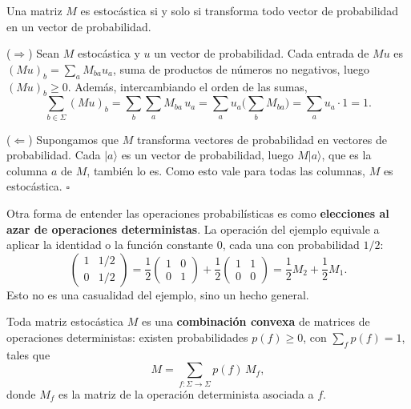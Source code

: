 \documentclass[11pt, a4paper, twoside, openright]{report}
\begin{document}
\begin{tcolorbox}[colback=teal!5!white,colframe=teal!75!black,title=\textbf{Proposición: Caracterización de las matrices estocásticas}]
Una matriz $M$ es estocástica si y solo si transforma todo vector de probabilidad en un vector de probabilidad.
\end{tcolorbox}

\begin{tcolorbox}[colback=gray!5!white,colframe=gray!75!black,title=\textbf{Demostración}]
($\Rightarrow$) Sean $M$ estocástica y $u$ un vector de probabilidad. Cada entrada de $Mu$ es $(Mu)_b = \sum_{a} M_{ba} u_a$, suma de productos de números no negativos, luego $(Mu)_b \geq 0$. Además, intercambiando el orden de las sumas,
\[ \sum_{b \in \Sigma} (Mu)_b = \sum_{b}\sum_{a} M_{ba}\, u_a = \sum_{a} u_a \Big( \sum_{b} M_{ba} \Big) = \sum_{a} u_a \cdot 1 = 1. \]

($\Leftarrow$) Supongamos que $M$ transforma vectores de probabilidad en vectores de probabilidad. Cada $|a\rangle$ es un vector de probabilidad, luego $M|a\rangle$, que es la columna $a$ de $M$, también lo es. Como esto vale para todas las columnas, $M$ es estocástica. \hfill $\square$
\end{tcolorbox}

\noindent Otra forma de entender las operaciones probabilísticas es como \textbf{elecciones al azar de operaciones deterministas}. La operación del ejemplo equivale a aplicar la identidad o la función constante $0$, cada una con probabilidad $1/2$:
\[
\begin{pmatrix} 1 & 1/2 \\ 0 & 1/2 \end{pmatrix} = \frac{1}{2}\begin{pmatrix} 1 & 0 \\ 0 & 1 \end{pmatrix} + \frac{1}{2}\begin{pmatrix} 1 & 1 \\ 0 & 0 \end{pmatrix} = \frac12 M_2 + \frac12 M_1.
\]
Esto no es una casualidad del ejemplo, sino un hecho general.

\begin{tcolorbox}[colback=teal!5!white,colframe=teal!75!black,title=\textbf{Proposición: Las operaciones probabilísticas son mezclas de deterministas}]
Toda matriz estocástica $M$ es una \textbf{combinación convexa} de matrices de operaciones deterministas: existen probabilidades $p(f) \geq 0$, con $\sum_f p(f) = 1$, tales que
\[ M = \sum_{f : \Sigma \to \Sigma} p(f)\, M_f, \]
donde $M_f$ es la matriz de la operación determinista asociada a $f$.
\end{tcolorbox}
\end{document}

